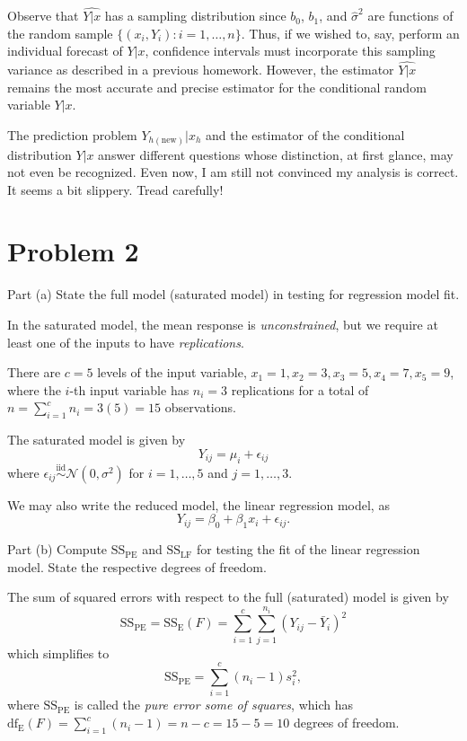 \documentclass[
]{article}
\begin{document}
Observe that \(\widehat{Y|x}\) has a sampling distribution since
\(b_0\), \(b_1\), and \(\hat{\sigma}^2\) are functions of the random
sample \(\{(x_i,Y_i) : i=1,\ldots,n\}\). Thus, if we wished to, say,
perform an individual forecast of \(Y|x\), confidence intervals must
incorporate this sampling variance as described in a previous homework.
However, the estimator \(\widehat{Y|x}\) remains the most accurate and
precise estimator for the conditional random variable \(Y|x\).

The prediction problem \(Y_{h(\text{new})}|x_h\) and the estimator of
the conditional distribution \(Y|x\) answer different questions whose
distinction, at first glance, may not even be recognized. Even now, I am
still not convinced my analysis is correct. It seems a bit slippery.
Tread carefully!

\hypertarget{problem-2}{%
\section{Problem 2}\label{problem-2}}

\begin{tcolorbox}[split=\f]
Part (a)
\tcblower
State the full model (saturated model) in testing for regression model fit.
\end{tcolorbox}

In the saturated model, the mean response is \emph{unconstrained}, but
we require at least one of the inputs to have \emph{replications}.

There are \(c=5\) levels of the input variable,
\(x_1=1,x_2=3,x_3=5,x_4=7,x_5=9\), where the \(i\)-th input variable has
\(n_i=3\) replications for a total of
\(n=\sum_{i=1}^{c} n_i = 3(5) = 15\) observations.

The saturated model is given by \[
  Y_{i j} = \mu_i + \epsilon_{i j}
\] where
\(\epsilon_{i j} \overset{\text{iid}}{\sim} \mathcal{N}(0,\sigma^2)\)
for \(i=1,\ldots,5\) and \(j=1,\ldots,3\).

We may also write the reduced model, the linear regression model, as \[
  Y_{i j} = \beta_0 + \beta_1 x_i + \epsilon_{i j}.
\]

\begin{tcolorbox}[split=\f]
Part (b)
\tcblower
Compute $\operatorname{SS_{PE}}$ and $\operatorname{SS_{LF}}$ for testing the fit of the linear regression model.
State the respective degrees of freedom.
\end{tcolorbox}

The sum of squared errors with respect to the full (saturated) model is
given by \[
  \operatorname{SS_{PE}}= \operatorname{SS_E}(F) = \sum_{i=1}^{c}\sum_{j=1}^{n_i} (Y_{i j} - \bar{Y}_i)^2
\] which simplifies to \[
  \operatorname{SS_{PE}}= \sum_{i=1}^{c} (n_i-1) s_i^2,
\] where \(\operatorname{SS_{PE}}\) is called the
\emph{pure error some of squares}, which has
\(\operatorname{df_E}(F) = \sum_{i=1}^{c} (n_i-1) = n-c = 15-5 = 10\)
degrees of freedom.
\end{document}
